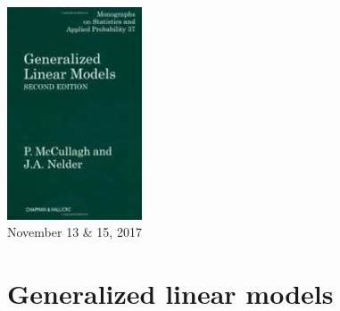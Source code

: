 \documentclass[color=usenames,dvipsnames]{beamer}\usepackage[]{graphicx}\usepackage[]{color}
\begin{document}
\begin{frame}[plain]
  \huge
  \begin{center}
    {\color{PineGreen}{Generalized Linear Models (GLMs)}} \\
    \vfill
    \includegraphics[width=0.3\textwidth]{McCullagh-Nelder} \\
    \large \vfill
    November 13 \& 15, 2017
  \end{center}
\end{frame}



\section{Generalized linear models}
\end{document}
